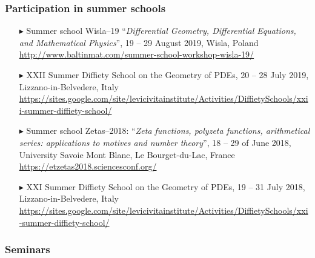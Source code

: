 \separator
\subsubsection{Participation in summer schools}

\begin{itemize}

  \item[$\blacktriangleright$] Summer school Wisla--19 ``\textit{Differential Geometry, Differential Equations, and Mathematical Physics}'', 19 -- 29 August 2019, Wisla, Poland \\
  \url{http://www.baltinmat.com/summer-school-workshop-wisla-19/}

  \item[$\blacktriangleright$] XXII Summer Diffiety School on the Geometry of PDEs, 20 -- 28 July 2019, Lizzano-in-Belvedere, Italy \\
  \url{https://sites.google.com/site/levicivitainstitute/Activities/DiffietySchools/xxii-summer-diffiety-school/}

  \item[$\blacktriangleright$] Summer school Zetas--2018: ``\textit{Zeta functions, polyzeta functions, arithmetical series: applications to motives and number theory}'', 18 -- 29 of June 2018, University Savoie Mont Blanc, Le Bourget-du-Lac, France \\
  \url{https://etzetas2018.sciencesconf.org/}
  
  \item[$\blacktriangleright$] XXI Summer Diffiety School on the Geometry of PDEs, 19 -- 31 July 2018, Lizzano-in-Belvedere, Italy \\
  \url{https://sites.google.com/site/levicivitainstitute/Activities/DiffietySchools/xxi-summer-diffiety-school/}

\end{itemize}

\separator
\subsubsection{Seminars}

